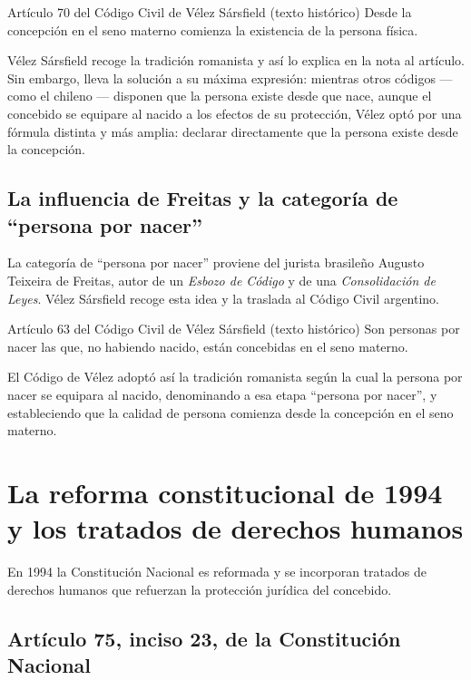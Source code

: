 \documentclass[12pt,oneside]{book}
\begin{document}
\begin{definition}{Artículo 70 del Código Civil de Vélez Sársfield (texto histórico)}
Desde la concepción en el seno materno comienza la existencia de la persona física.
\end{definition}

Vélez Sársfield recoge la tradición romanista y así lo explica en la nota al artículo. Sin embargo, lleva la solución a su máxima expresión: mientras otros códigos --- como el chileno --- disponen que la persona existe desde que nace, aunque el concebido se equipare al nacido a los efectos de su protección, Vélez optó por una fórmula distinta y más amplia: declarar directamente que la persona existe desde la concepción.

\subsection{La influencia de Freitas y la categoría de ``persona por nacer''}

La categoría de ``persona por nacer'' proviene del jurista brasileño Augusto Teixeira de Freitas, autor de un \textit{Esbozo de Código} y de una \textit{Consolidación de Leyes}. Vélez Sársfield recoge esta idea y la traslada al Código Civil argentino.

\begin{definition}{Artículo 63 del Código Civil de Vélez Sársfield (texto histórico)}
Son personas por nacer las que, no habiendo nacido, están concebidas en el seno materno.
\end{definition}

El Código de Vélez adoptó así la tradición romanista según la cual la persona por nacer se equipara al nacido, denominando a esa etapa ``persona por nacer'', y estableciendo que la calidad de persona comienza desde la concepción en el seno materno.

\section{La reforma constitucional de 1994 y los tratados de derechos humanos}

En 1994 la Constitución Nacional es reformada y se incorporan tratados de derechos humanos que refuerzan la protección jurídica del concebido.

\subsection{Artículo 75, inciso 23, de la Constitución Nacional}
\end{document}
